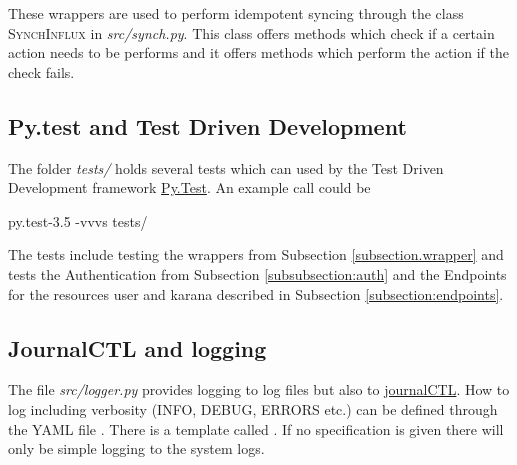 These wrappers are used to perform idempotent syncing through the class \textsc{SynchInflux} in \textit{src/synch.py}. This class offers methods which check if a certain action needs to be performs and it offers methods which perform the action if the check fails. 
\subsection{Py.test and Test Driven Development}
The folder \textit{tests/} holds several tests which can used by the Test Driven Development framework \href{https://wiki.python.org/moin/PyTest}{Py.Test}. An example call could be
\begin{tcolorbox}
	py.test-3.5 -vvvs tests/
\end{tcolorbox}
The tests include testing the wrappers from Subsection \ref{subsection.wrapper} and tests the Authentication from Subsection \ref{subsubsection:auth} and the Endpoints for the resources user and karana described in Subsection \ref{subsection:endpoints}.
\subsection{JournalCTL and logging}
The file \textit{src/logger.py} provides logging to log files but also to \href{https://www.freedesktop.org/software/systemd/man/journalctl.html}{journalCTL}. How to log including verbosity (INFO, DEBUG, ERRORS etc.) can be defined through the YAML file . There is a template called . If no specification is given there will only be simple logging to the system logs.